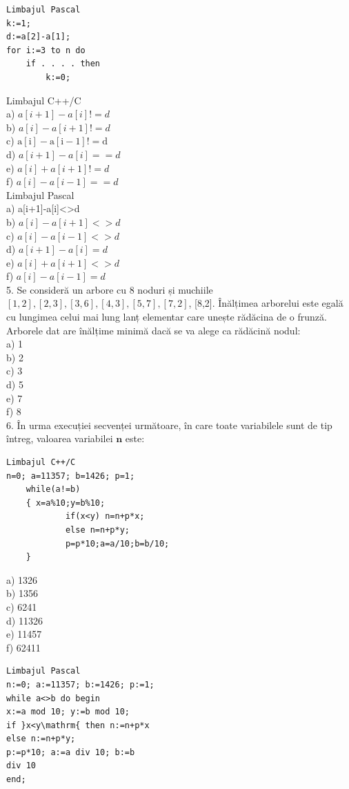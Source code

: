\documentclass[10pt]{article}
\begin{document}
\begin{verbatim}
Limbajul Pascal
k:=1;
d:=a[2]-a[1];
for i:=3 to n do
    if . . . . then
        k:=0;
\end{verbatim}

Limbajul C++/C\\
a) $a[i+1]-a[i]!=d$\\
b) $a[i]-a[i+1]!=d$\\
c) $\mathrm{a}[\mathrm{i}]-\mathrm{a}[\mathrm{i}-1]!=\mathrm{d}$\\
d) $a[i+1]-a[i]==d$\\
e) $a[i]+a[i+1]!=d$\\
f) $a[i]-a[i-1]==d$\\
Limbajul Pascal\\[0pt]
a) a[i+1]-a[i]<>d\\
b) $a[i]-a[i+1]<>d$\\
c) $a[i]-a[i-1]<>d$\\
d) $a[i+1]-a[i]=d$\\
e) $a[i]+a[i+1]<>d$\\
f) $a[i]-a[i-1]=d$\\
5. Se consideră un arbore cu 8 noduri și muchiile $[1,2],[2,3],[3,6],[4,3],[5,7],[7,2]$, [8,2]. Înălțimea arborelui este egală cu lungimea celui mai lung lanț elementar care unește rădăcina de o frunză. Arborele dat are înălțime minimă dacă se va alege ca rădăcină nodul:\\
a) 1\\
b) 2\\
c) 3\\
d) 5\\
e) 7\\
f) 8\\
6. În urma execuției secvenței următoare, în care toate variabilele sunt de tip întreg, valoarea variabilei $\boldsymbol{n}$ este:

\begin{verbatim}
Limbajul C++/C
n=0; a=11357; b=1426; p=1;
    while(a!=b)
    { x=a%10;y=b%10;
            if(x<y) n=n+p*x;
            else n=n+p*y;
            p=p*10;a=a/10;b=b/10;
    }
\end{verbatim}

a) 1326\\
b) 1356\\
c) 6241\\
d) 11326\\
e) 11457\\
f) 62411

\begin{verbatim}
Limbajul Pascal
n:=0; a:=11357; b:=1426; p:=1;
while a<>b do begin
x:=a mod 10; y:=b mod 10;
if }x<y\mathrm{ then n:=n+p*x
else n:=n+p*y;
p:=p*10; a:=a div 10; b:=b
div 10
end;
\end{verbatim}
\end{document}
